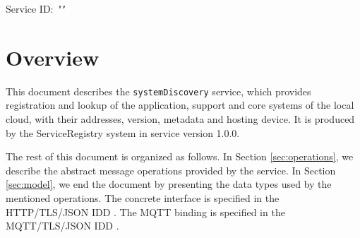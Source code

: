 \documentclass[a4paper]{arrowhead}
\begin{document}
\sloppy

\ArrowheadSetup

\begin{center}
  \vspace*{1cm}
  \huge{\arrowtitle}

  \vspace*{0.2cm}
  \LARGE{\arrowtype}
  \vspace*{1cm}

  \Large{Service ID: \textit{"\arrowid"}}

  \vspace*{\fill}


  \vspace*{1cm}
  \vspace*{\fill}

  \begin{abstract}
    This document describes the \texttt{systemDiscovery} service, version 1.0.0, produced by the ServiceRegistry core system of Arrowhead 5.2.2.
  \end{abstract}

  \vspace*{1cm}
\end{center}

\newpage

\tableofcontents
\newpage

\section{Overview}
\label{sec:overview}

This document describes the \texttt{systemDiscovery} service, which provides registration and lookup of the application, support and core systems of the local cloud, with their addresses, version, metadata and hosting device.
It is produced by the ServiceRegistry system \cite{sr-sysd} in service version 1.0.0.

The rest of this document is organized as follows.
In Section \ref{sec:operations}, we describe the abstract message operations provided by the service.
In Section \ref{sec:model}, we end the document by presenting the data types used by the mentioned operations.
The concrete interface is specified in the HTTP/TLS/JSON IDD \cite{sr-systemDiscovery-http-idd}. The MQTT binding is specified in the MQTT/TLS/JSON IDD \cite{sr-systemDiscovery-mqtt-idd}.
\end{document}

